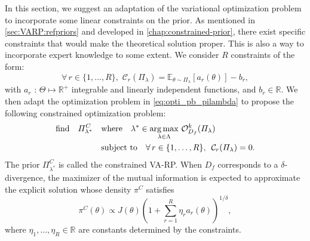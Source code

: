 In this section, we suggest an adaptation of the variational optimization problem to incorporate some linear constraints on the prior. As mentioned in \cref{sec:VARP:refpriors} and developed in \cref{chap:constrained-prior}, 
there exist specific constraints that would make the theoretical solution proper.
This is also a way to incorporate expert knowledge to some extent. We consider $R$ constraints of the form:
\begin{equation}
 \forall \, r \in \{1,\ldots,R\} \text{,}\, \,   \, \mathcal{C}_r(\varPi_{\lambda}) = \mathbb{E}_{\theta \sim \varPi_{\lambda}} \left[ a_r(\theta) \right] - b_r,
\end{equation}
with $a_r$ : $\Theta \mapsto \mathbb{R}^+$ integrable and linearly independent functions, and $b_r \in \mathbb{R}$. We then adapt the optimization problem in \cref{eq:opti_pb_pilambda} to propose the following constrained optimization problem:
\begin{equation}
\begin{aligned}
\text{find}\quad \varPi^C_{\lambda^\ast}\quad&\text{where}\quad \lambda^\ast\in \operatorname*{arg\,max}_{\lambda \in \Lambda} \, \mathcal{O}^k_{D_f}(\varPi_{\lambda}) \\
& \text{subject to} \quad \forall \,r \in \{1, \ldots, R\}, \, \,   \, \mathcal{C}_r(\varPi_{\lambda}) = 0.
\end{aligned}
\end{equation}
The prior $\varPi^C_{\lambda^\ast}$ is called the constrained VA-RP. %
When $D_f$ corresponds to a $\delta$-divergence, the maximizer of the mutual information is expected to approximate the explicit solution whose density $\pi^C$ satisfies 
\begin{equation}
    \pi^C(\theta) \propto J(\theta)  \left( 1 + \sum_{r=1}^R \eta_r a_r(\theta)  \right)^{1/\delta},
\end{equation}
    where $\eta_1,\dots, \eta_R \in \mathbb{R}$ are constants determined by the constraints.

